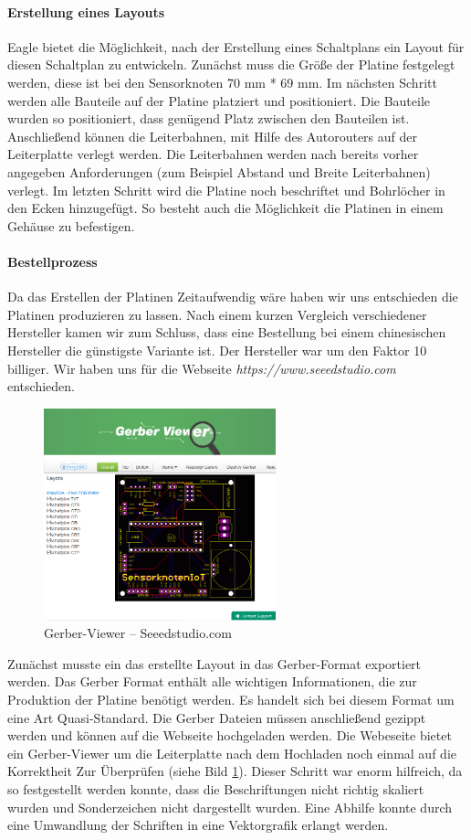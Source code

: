 \paragraph{Erstellung eines Layouts} Eagle bietet die Möglichkeit, nach der Erstellung eines Schaltplans ein Layout für diesen Schaltplan zu entwickeln. Zunächst muss die Größe der Platine festgelegt werden, diese ist bei den Sensorknoten 70 mm * 69 mm. Im nächsten Schritt werden alle Bauteile auf der Platine platziert und positioniert. Die Bauteile wurden so positioniert, dass genügend Platz zwischen den Bauteilen ist.  Anschließend können die Leiterbahnen, mit Hilfe des Autorouters auf der Leiterplatte verlegt werden. Die Leiterbahnen werden nach bereits vorher angegeben Anforderungen (zum Beispiel Abstand und Breite Leiterbahnen) verlegt. Im letzten Schritt wird die Platine noch beschriftet und Bohrlöcher in den Ecken hinzugefügt. So besteht auch die Möglichkeit die Platinen in einem Gehäuse zu befestigen. 
\paragraph{Bestellprozess} Da das Erstellen der Platinen Zeitaufwendig wäre haben wir uns entschieden die Platinen produzieren zu lassen. Nach einem kurzen Vergleich verschiedener Hersteller kamen wir zum Schluss, dass eine Bestellung bei einem chinesischen Hersteller die günstigste Variante ist. Der Hersteller war um den Faktor 10 billiger. Wir haben uns für die Webseite \textit{https://www.seeedstudio.com} entschieden. 
\begin{figure}
	\centering
	\includegraphics[width=0.6\textwidth]{bilder/gerberViewer}
	\caption{Gerber-Viewer – Seeedstudio.com}
	\label{img:GerberViewer}
\end{figure}

Zunächst musste ein das erstellte Layout in das Gerber-Format exportiert werden. Das Gerber Format enthält alle wichtigen Informationen, die zur Produktion der Platine benötigt werden. Es handelt sich bei diesem Format um eine Art Quasi-Standard. Die Gerber Dateien müssen anschließend gezippt werden und können auf die Webseite hochgeladen werden. Die Webeseite bietet ein Gerber-Viewer um die Leiterplatte nach dem Hochladen noch einmal auf die Korrektheit Zur Überprüfen (siehe Bild \ref{img:GerberViewer}). Dieser Schritt war enorm hilfreich, da so festgestellt werden konnte, dass die Beschriftungen nicht richtig skaliert wurden und Sonderzeichen nicht dargestellt wurden. Eine Abhilfe konnte durch eine Umwandlung der Schriften in eine Vektorgrafik erlangt werden. 

